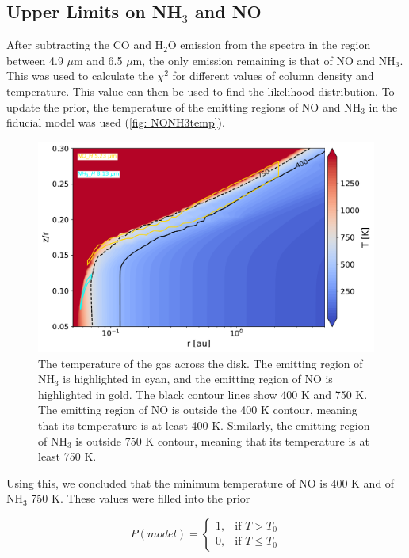 \documentclass[oneside, single, authoryear, semicolon, 12pt]{lion-msc}
\newcommand{\4}{$_4$}
\newcommand{\3}{$_3$}
\newcommand{\2}{$_2$}
\begin{document}
\subsection{Upper Limits on NH\3 and NO}
After subtracting the CO and H\2O emission from the spectra in the region between 4.9 $\mu$m and 6.5 $\mu$m, the only emission remaining is that of NO and NH\3. This was used to calculate the $\chi^2$ for different values of column density and temperature. This value can then be used to find the likelihood distribution. To update the prior, the temperature of the emitting regions of NO and NH\3 in the fiducial model was used (\autoref{fig: NONH3temp}).

\begin{figure}[H]
    \centering
    \includegraphics[width=\linewidth]{Figures/NONH3temp.pdf}
    \caption{The temperature of the gas across the disk. The emitting region of NH\3 is highlighted in cyan, and the emitting region of NO is highlighted in gold. The black contour lines show 400 K and 750 K. The emitting region of NO is outside the 400 K contour, meaning that its temperature is at least 400 K. Similarly, the emitting region of NH\3 is outside 750 K contour, meaning that its temperature is at least 750 K.}
    \label{fig: NONH3temp}
\end{figure}

Using this, we concluded that the minimum temperature of NO is 400 K and of NH\3 750 K. These values were filled into the prior

\begin{equation}
    P(model) = 
    \begin{cases}
        1, & \text{if } T > T_0 \\
        0, & \text{if } T \leq T_0
    \end{cases}
\end{equation}
\end{document}
